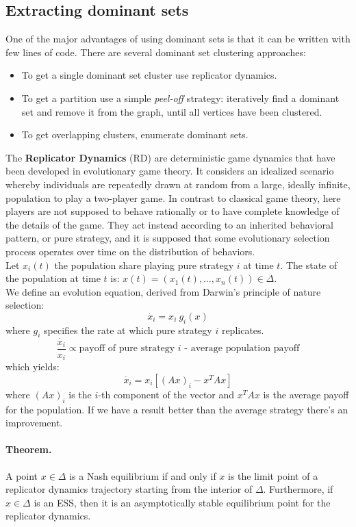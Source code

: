 \subsection{Extracting dominant sets}
One of the major advantages of using dominant sets is that it can be written with few lines of code. There are several dominant set clustering approaches:
\begin{itemize}
	\item To get a single dominant set cluster use replicator dynamics.
	\item To get a partition use a simple \textit{peel-off} strategy: iteratively find a dominant set and remove it from the graph, until all vertices have been clustered.
	\item To get overlapping clusters, enumerate dominant sets. 
\end{itemize}
The \textbf{Replicator Dynamics} (RD) are deterministic game dynamics that have been developed in evolutionary game theory. It considers an idealized scenario whereby individuals are repeatedly drawn at random from a large, ideally infinite, population to play a two-player game. In contrast to classical game theory, here players are not supposed to behave rationally or to have complete knowledge of the details of the game. They act instead according to an inherited behavioral pattern, or pure strategy, and it is supposed that some evolutionary selection process operates over time on the distribution of behaviors.\\
Let $x_i(t)$ the population share playing pure strategy $i$ at time $t$. The state of the population at time $t$ is: $x(t) = (x_1(t),\dots,x_n(t))\in\Delta$.\\
We define an evolution equation, derived from Darwin's principle of nature selection:
$$\dot{x_i} = x_i~g_i(x)$$
where $g_i$ specifies the rate at which pure strategy $i$ replicates.
$$\frac{\dot{x_i}}{x_i} \propto \text{payoff of pure strategy }i\text{ - average population payoff}$$
which yields:
$$\dot{x_i} = x_i[(Ax)_i - x^TAx]$$
where $(Ax)_i$ is the $i$-th component of the vector and $x^TAx$ is the average payoff for the population. If we have a result better than the average strategy there's an improvement.

\paragraph{Theorem.} A point $x\in\Delta$ is a Nash equilibrium if and only if $x$ is the limit point of a replicator dynamics trajectory starting from the interior of $\Delta$.
Furthermore, if $x\in\Delta$ is an ESS, then it is an asymptotically stable equilibrium point for the replicator dynamics.\\

